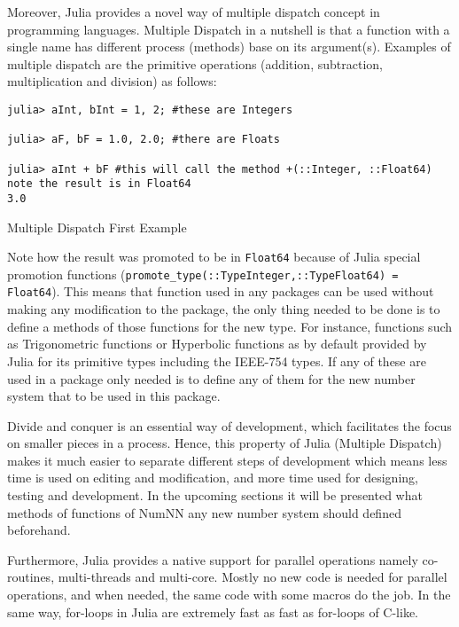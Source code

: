 Moreover, Julia provides a novel way of multiple dispatch\cite{WikiMultipleDispatch} concept in programming languages\cite{JuliaMehtods}. Multiple Dispatch in a nutshell is that a function with a single name has different process (methods) base on its argument(s). Examples of multiple dispatch are the primitive operations (addition, subtraction, multiplication and division) as follows:

\begin{listing}[H]
\begin{verbatim}
julia> aInt, bInt = 1, 2; #these are Integers

julia> aF, bF = 1.0, 2.0; #there are Floats

julia> aInt + bF #this will call the method +(::Integer, ::Float64) note the result is in Float64
3.0
\end{verbatim}
\caption{Multiple Dispatch First Example}
\end{listing}

Note how the result was promoted to be in \texttt{Float64} because of Julia special promotion functions (\texttt{promote_type(::Type{Integer},::Type{Float64}) = Float64}). This means that function used in any packages can be used without making any modification to the package, the only thing needed to be done is to define a methods of those functions for the new type. For instance, functions such as Trigonometric functions or Hyperbolic functions as by default provided by Julia for its primitive types including the IEEE-754 types. If any of these are used in a package only needed is to define any of them for the new number system that to be used in this package.

Divide and conquer is an essential way of development, which facilitates the focus on smaller pieces in a process. Hence, this property of Julia (Multiple Dispatch) makes it much easier to separate different steps of development which means less time is used on editing and modification, and more time used for designing, testing and development. In the upcoming sections it will be presented what methods of functions of NumNN any new number system should defined beforehand.

Furthermore, Julia provides a native support for parallel operations namely co-routines, multi-threads and multi-core. Mostly no new code is needed for parallel operations, and when needed, the same code with some macros do the job. In the same way, for-loops in Julia are extremely fast as fast as for-loops of C-like. 
